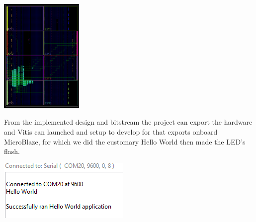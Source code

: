 \documentclass[11pt]{article}
\begin{document}
\begin{preview}
\begin{center}
  \includegraphics[width=0.3\textwidth]{inc/device.PNG}
\end{center}

From the implemented design and bitstream the project can export the hardware and Vitis can launched and setup to develop for that exports onboard MicroBlaze, for which we did the customary Hello World then made the LED's flash. 

\begin{center}
  \includegraphics[]{inc/hello.PNG}
\end{center}


\end{preview}
\end{document}
